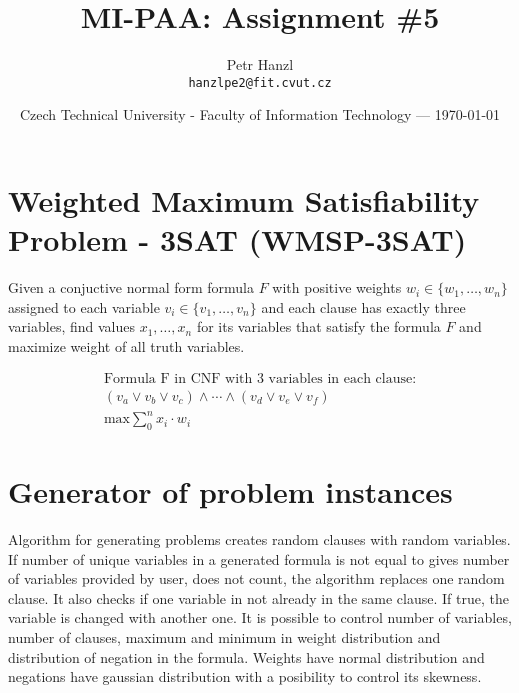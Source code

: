 \documentclass{article}
\title{MI-PAA: Assignment \#5} %
\author{Petr Hanzl\\ \texttt{hanzlpe2@fit.cvut.cz}} %
\date{Czech Technical University - Faculty of Information Technology --- \today} %
\begin{document}
\maketitle %

	

\section*{Weighted Maximum Satisfiability Problem - 3SAT (WMSP-3SAT)} %

Given a conjuctive normal form formula $F$ with positive weights $w_i \in \{w_1,\dots,w_n\}$ assigned to each variable $v_i \in \{v_1,\dots,v_n\}$ and each clause has exactly three variables, find values $x_1,\dots,x_n$ for its variables that satisfy the formula $F$ and maximize weight of all truth variables.

	\begin{gather*}
		\text{Formula F in CNF with 3 variables in each clause:}\\
		(v_a \lor v_b \lor v_c)\land\cdots \land (v_d \lor v_e \lor v_f)\\
		\text{max} \sum_0^n{x_i \cdot w_i}
	\end{gather*}


\section{Generator of problem instances}
	Algorithm for generating problems creates random clauses with random variables. If number of unique variables in a generated formula is not equal to gives number of variables provided by user, does not count, the algorithm replaces one random clause. It also checks if one variable in not already in the same clause. If true, the variable is changed with another one. It is possible to control number of variables, number of clauses, maximum and minimum in weight distribution and distribution of negation in the formula. Weights have normal distribution and negations have gaussian distribution with a posibility to control its skewness.
\end{document}
